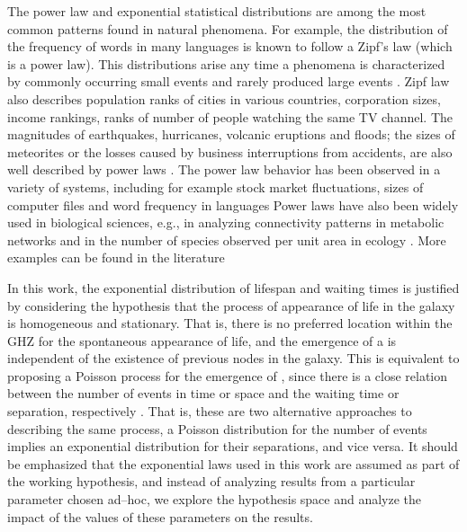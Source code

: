 The power law and exponential statistical distributions are among the
most common patterns found in natural phenomena.
%
For example, the distribution of the frequency of words in many
languages is known to follow a Zipf's law (which is a power law).
%
This distributions arise any time a phenomena is characterized by
commonly occurring small events and rarely produced large events
\citep[e.g. ][]{adamic_zipf_2000}.
%
Zipf law also describes population ranks of cities in various
countries, corporation sizes, income rankings, ranks of number of
people watching the same TV channel.
%
The magnitudes of earthquakes, hurricanes, volcanic eruptions and
floods; the sizes of meteorites or the losses caused by business
interruptions from accidents, are also well described by power laws
\citep{sornette_critical_2006, benguigui_classificacion_2016}.
%
The power law behavior has been observed in a variety of systems,
including for example stock market fluctuations, sizes of computer
files and word frequency in languages \citep{mitzenmacher_brief_2004,
newman_power_2005, simkin_theory_2006}
%
Power laws have also been widely used in biological sciences, e.g., in
analyzing connectivity patterns in metabolic networks
\citep{jeong_large_2000} and in the number of species observed per
unit area in ecology \citep{martin_origin_2006, frank_common_2009}.
% 
More examples can be found in the literature
\citep{martin_origin_2006, maccone_KLT_2010, barabasi_scale_2009,
maccone_evolution_2014, maccone_lognormals_2014,
benguigui_classificacion_2016}
 


In this work, the exponential distribution of lifespan and waiting
times is justified by considering the hypothesis that the process of
appearance of life in the galaxy is homogeneous and stationary.
%
That is, there is no preferred location within the GHZ for the
spontaneous appearance of life, and the emergence of a \ceti{} is
independent of the existence of previous nodes in the galaxy.
%            
This is equivalent to proposing a Poisson process for the emergence of
\cetis{}, since there is a close relation between the number of events
in time or space and the waiting time or separation, respectively
\citep[e.g., ][]{ross_simulation_2012}.
%
That is, these are two alternative approaches to describing the same
process, a Poisson distribution for the number of events implies an
exponential distribution for their separations, and vice versa.
%
It should be emphasized that the exponential laws used in this work
are assumed as part of the working hypothesis, and instead of
analyzing results from a particular parameter chosen ad--hoc, we
explore the hypothesis space and analyze the impact of the values of
these parameters on the results.
 
